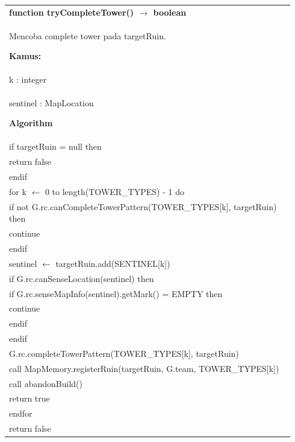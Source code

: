 \documentclass{article}
\newenvironment{pseudobox}
{
\centering
\begin{longtable}{|p{0.94\linewidth}|}
\hline
}
{
\\ \hline
\end{longtable}
\vspace{0.05cm}
}
\begin{document}
\begin{pseudobox}
\textbf{function tryCompleteTower() $\rightarrow$ boolean} \\
{ Mencoba complete tower pada targetRuin. }

\textbf{Kamus:} \\
\hspace*{1em} k : integer \\
\hspace*{1em} sentinel : MapLocation

\textbf{Algorithm} \\
\hspace*{1em} if targetRuin = null then \\
\hspace*{2em} return false \\
\hspace*{1em} endif \\

\hspace*{1em} for k $\leftarrow$ 0 to length(TOWER\_TYPES) - 1 do \\
\hspace*{2em} if not G.rc.canCompleteTowerPattern(TOWER\_TYPES[k], targetRuin) then \\
\hspace*{3em} continue \\
\hspace*{2em} endif \\

\hspace*{2em} sentinel $\leftarrow$ targetRuin.add(SENTINEL[k]) \\

\hspace*{2em} if G.rc.canSenseLocation(sentinel) then \\
\hspace*{3em} if G.rc.senseMapInfo(sentinel).getMark() = EMPTY then \\
\hspace*{4em} continue \\
\hspace*{3em} endif \\
\hspace*{2em} endif \\

\hspace*{2em} G.rc.completeTowerPattern(TOWER\_TYPES[k], targetRuin) \\
\hspace*{2em} call MapMemory.registerRuin(targetRuin, G.team, TOWER\_TYPES[k]) \\
\hspace*{2em} call abandonBuild() \\
\hspace*{2em} return true \\
\hspace*{1em} endfor \\

\hspace*{1em} return false
\end{pseudobox}
\end{document}
